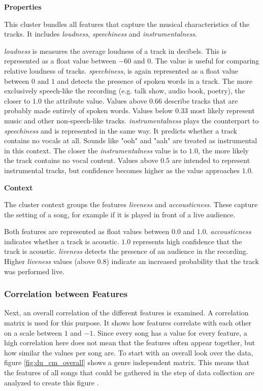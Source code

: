 \textbf{Properties}

This cluster bundles all features that capture the musical characteristics of the tracks.
It includes \emph{loudness}, \emph{speechiness} and \emph{instrumentalness}.

\emph{loudness} is measures the average loudness of a track in decibels. This is represented as a float value between \(-60\) and \(0\).
The value is useful for comparing relative loudness of tracks. 
\emph{speechiness}, is again represented as a float value between \(0\) and \(1\) and detects the presence of spoken words in a track. 
The more exclusively speech-like the recording (e.g. talk show, audio book, poetry),
the closer to \(1.0\) the attribute value. 
Values above \(0.66\) describe tracks that are probably made entirely of spoken words.
Values below \(0.33\) most likely represent music and other non-speech-like tracks. 
\emph{instrumentalness} plays the counterpart to \emph{speechiness} and is represented in the same way.
It predicts whether a track contains no vocals at all. Sounds like "ooh" and "aah" are treated as instrumental in this context.
The closer the \emph{instrumentalness} value is to \(1.0\), the more likely the track contains no vocal content. 
Values above \(0.5\) are intended to represent instrumental tracks, but confidence becomes higher as the value approaches \(1.0\). \cite[]{Features}

\textbf{Context}

The cluster context groups the features \emph{liveness} and \emph{accousticness}.
These capture the setting of a song, for example if it is played in front of a live audience.

Both features are represented as float values between \(0.0\) and \(1.0\).
\emph{accousticness} indicates whether a track is acoustic. \(1.0\) represents high confidence that the track is acoustic. 
\emph{liveness} detects the presence of an audience in the recording. 
Higher \emph{liveness} values (above $0.8$) indicate an increased probability that the track was performed live.

\subsubsection{Correlation between Features}
\label{sec:correlation between features}

Next, an overall correlation of the different features is examined.
A correlation matrix is used for this purpose. It shows how
features correlate with each other on a scale between \(1\) and \(-1\).
Since every song has a value for every feature, a high correlation here does not mean that the features often appear together,
but how similar the values per song are. To start with an overall look over the data,
figure \ref{fig:du_cm_overall}  shows a genre independent matrix.
This means that the features of all songs that could be gathered in the step of data
collection are analyzed to create this figure \cite{Features}.

